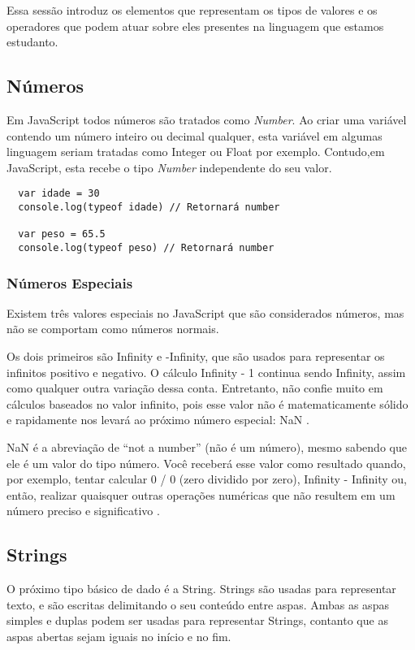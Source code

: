 Essa sessão introduz os elementos que representam os tipos de valores e os operadores que podem atuar sobre eles presentes na linguagem que estamos estudanto.

\subsection{Números}
Em JavaScript todos números são tratados como \textit{Number}. Ao criar uma variável contendo um número inteiro ou decimal qualquer, esta variável em algumas linguagem seriam tratadas como Integer ou Float por exemplo. Contudo,em JavaScript, esta recebe o tipo \textit{Number} independente do seu valor.

\begin{lstlisting}
  var idade = 30
  console.log(typeof idade) // Retornará number

  var peso = 65.5
  console.log(typeof peso) // Retornará number
\end{lstlisting}

\subsubsection{Números Especiais}

Existem três valores especiais no JavaScript que são considerados números, mas não se comportam como números normais.

Os dois primeiros são Infinity e -Infinity, que são usados para representar os infinitos positivo e negativo. O cálculo Infinity - 1 continua sendo Infinity, assim como qualquer outra variação dessa conta. Entretanto, não confie muito em cálculos baseados no valor infinito, pois esse valor não é matematicamente sólido e rapidamente nos levará ao próximo número especial: NaN \cite{haverbeke2014eloquent}.

NaN é a abreviação de “not a number” (não é um número), mesmo sabendo que ele é um valor do tipo número. Você receberá esse valor como resultado quando, por exemplo, tentar calcular 0 / 0 (zero dividido por zero), Infinity - Infinity ou, então, realizar quaisquer outras operações numéricas que não resultem em um número preciso e significativo \cite{haverbeke2014eloquent}.

\subsection{Strings}

O próximo tipo básico de dado é a String. Strings são usadas para representar texto, e são escritas delimitando o seu conteúdo entre aspas. Ambas as aspas simples e duplas podem ser usadas para representar Strings, contanto que as aspas abertas sejam iguais no início e no fim.

